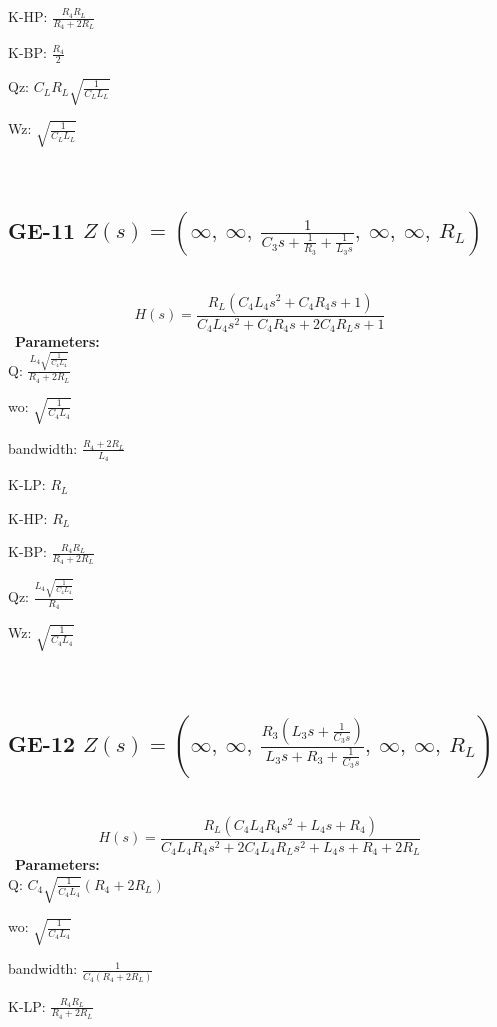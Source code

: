 \documentclass{article}
\begin{document}
K-HP: $\frac{R_{4} R_{L}}{R_{4} + 2 R_{L}}$\ 

K-BP: $\frac{R_{4}}{2}$\ 

Qz: $C_{L} R_{L} \sqrt{\frac{1}{C_{L} L_{L}}}$\ 

Wz: $\sqrt{\frac{1}{C_{L} L_{L}}}$\ 

\ 

\subsection{GE-11 $Z(s) = \left( \infty, \  \infty, \  \frac{1}{C_{3} s + \frac{1}{R_{3}} + \frac{1}{L_{3} s}}, \  \infty, \  \infty, \  R_{L}\right)$ } \ 
\textbf{\[H(s) = \frac{R_{L} \left(C_{4} L_{4} s^{2} + C_{4} R_{4} s + 1\right)}{C_{4} L_{4} s^{2} + C_{4} R_{4} s + 2 C_{4} R_{L} s + 1}\] } \ 
\textbf{Parameters:}\\ 

Q: $\frac{L_{4} \sqrt{\frac{1}{C_{4} L_{4}}}}{R_{4} + 2 R_{L}}$\ 

wo: $\sqrt{\frac{1}{C_{4} L_{4}}}$\ 

bandwidth: $\frac{R_{4} + 2 R_{L}}{L_{4}}$\ 

K-LP: $R_{L}$\ 

K-HP: $R_{L}$\ 

K-BP: $\frac{R_{4} R_{L}}{R_{4} + 2 R_{L}}$\ 

Qz: $\frac{L_{4} \sqrt{\frac{1}{C_{4} L_{4}}}}{R_{4}}$\ 

Wz: $\sqrt{\frac{1}{C_{4} L_{4}}}$\ 

\ 

\subsection{GE-12 $Z(s) = \left( \infty, \  \infty, \  \frac{R_{3} \left(L_{3} s + \frac{1}{C_{3} s}\right)}{L_{3} s + R_{3} + \frac{1}{C_{3} s}}, \  \infty, \  \infty, \  R_{L}\right)$ } \ 
\textbf{\[H(s) = \frac{R_{L} \left(C_{4} L_{4} R_{4} s^{2} + L_{4} s + R_{4}\right)}{C_{4} L_{4} R_{4} s^{2} + 2 C_{4} L_{4} R_{L} s^{2} + L_{4} s + R_{4} + 2 R_{L}}\] } \ 
\textbf{Parameters:}\\ 

Q: $C_{4} \sqrt{\frac{1}{C_{4} L_{4}}} \left(R_{4} + 2 R_{L}\right)$\ 

wo: $\sqrt{\frac{1}{C_{4} L_{4}}}$\ 

bandwidth: $\frac{1}{C_{4} \left(R_{4} + 2 R_{L}\right)}$\ 

K-LP: $\frac{R_{4} R_{L}}{R_{4} + 2 R_{L}}$\ 
\end{document}
